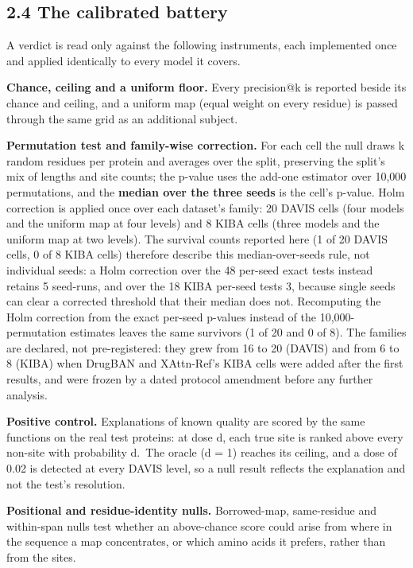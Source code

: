 \subsection{2.4 The calibrated battery}\label{the-calibrated-battery}

A verdict is read only against the following instruments, each implemented once and applied identically to every model it covers.

\textbf{Chance, ceiling and a uniform floor.} Every precision@k is reported beside its chance and ceiling, and a uniform map (equal weight on every residue) is passed through the same grid as an additional subject.

\textbf{Permutation test and family-wise correction.} For each cell the null draws k random residues per protein and averages over the split, preserving the split's mix of lengths and site counts; the p-value uses the add-one estimator over 10,000 permutations, and the \textbf{median over the three seeds} is the cell's p-value. Holm correction \citep{Holm1979} is applied once over each dataset's family: 20 DAVIS cells (four models and the uniform map at four levels) and 8 KIBA cells (three models and the uniform map at two levels). The survival counts reported here (1 of 20 DAVIS cells, 0 of 8 KIBA cells) therefore describe this median-over-seeds rule, not individual seeds: a Holm correction over the 48 per-seed exact tests instead retains 5 seed-runs, and over the 18 KIBA per-seed tests 3, because single seeds can clear a corrected threshold that their median does not. Recomputing the Holm correction from the exact per-seed p-values instead of the 10,000-permutation estimates leaves the same survivors (1 of 20 and 0 of 8). The families are declared, not pre-registered: they grew from 16 to 20 (DAVIS) and from 6 to 8 (KIBA) when DrugBAN and XAttn-Ref's KIBA cells were added after the first results, and were frozen by a dated protocol amendment before any further analysis.

\textbf{Positive control.} Explanations of known quality are scored by the same functions on the real test proteins: at dose d, each true site is ranked above every non-site with probability d.~The oracle (d = 1) reaches its ceiling, and a dose of 0.02 is detected at every DAVIS level, so a null result reflects the explanation and not the test's resolution.

\textbf{Positional and residue-identity nulls.} Borrowed-map, same-residue and within-span nulls test whether an above-chance score could arise from where in the sequence a map concentrates, or which amino acids it prefers, rather than from the sites.

